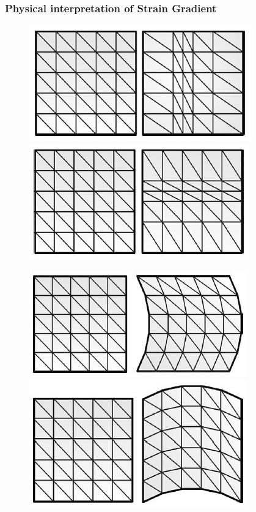 \documentclass[12pt]{article}
\begin{document}
\subsubsection{ Physical interpretation of Strain Gradient}
\begin{figure}[H]
	\begin{center}
		\includegraphics[scale=0.8]{U111_Eta_111.JPG}  \qquad \qquad
		\includegraphics[scale=0.8]{U222_Eta_222.JPG}
	\end{center}  
\end{figure}
\begin{figure}[H]
	\begin{center}
		\includegraphics[scale=0.8]{U122_Eta_122.JPG}  \qquad \qquad
		\includegraphics[scale=0.8]{U211_Eta_211.JPG}
	\end{center}  
\end{figure}
\end{document}
